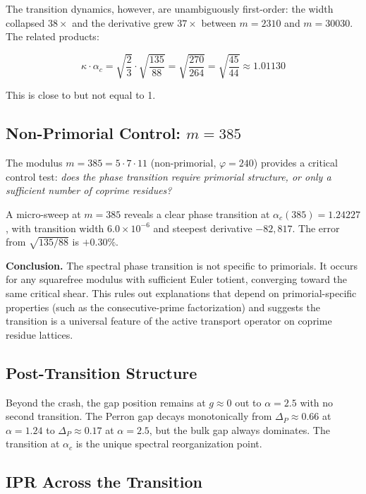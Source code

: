 \documentclass[11pt,letterpaper]{article}
\theoremstyle{definition}
\theoremstyle{remark}
\begin{document}
The transition dynamics, however, are unambiguously first-order: the width collapsed $38\times$ and the derivative grew $37\times$ between $m = 2310$ and $m = 30030$. The related products:

\[\kappa \cdot \alpha_c = \sqrt{\frac{2}{3}} \cdot \sqrt{\frac{135}{88}} = \sqrt{\frac{270}{264}} = \sqrt{\frac{45}{44}} \approx 1.01130\]

This is close to but not equal to 1.

\subsection{Non-Primorial Control: $m = 385$}\label{non-primorial-control-m-385}

The modulus $m = 385 = 5 \cdot 7 \cdot 11$ (non-primorial, $\varphi = 240$) provides a critical control test: \emph{does the phase transition require primorial structure, or only a sufficient number of coprime residues?}

A micro-sweep at $m = 385$ reveals a clear phase transition at $\alpha_c(385) = 1.24227$, with transition width $6.0 \times 10^{-6}$ and steepest derivative $-82{,}817$. The error from $\sqrt{135/88}$ is $+0.30\%$.

\textbf{Conclusion.} The spectral phase transition is not specific to primorials. It occurs for any squarefree modulus with sufficient Euler totient, converging toward the same critical shear. This rules out explanations that depend on primorial-specific properties (such as the consecutive-prime factorization) and suggests the transition is a universal feature of the active transport operator on coprime residue lattices.

\subsection{Post-Transition Structure}\label{post-transition-structure}

Beyond the crash, the gap position remains at $g \approx 0$ out to $\alpha = 2.5$ with no second transition. The Perron gap decays monotonically from $\Delta_P \approx 0.66$ at $\alpha = 1.24$ to $\Delta_P \approx 0.17$ at $\alpha = 2.5$, but the bulk gap always dominates. The transition at $\alpha_c$ is the unique spectral reorganization point.

\subsection{IPR Across the Transition}\label{ipr-across-the-transition}
\end{document}
